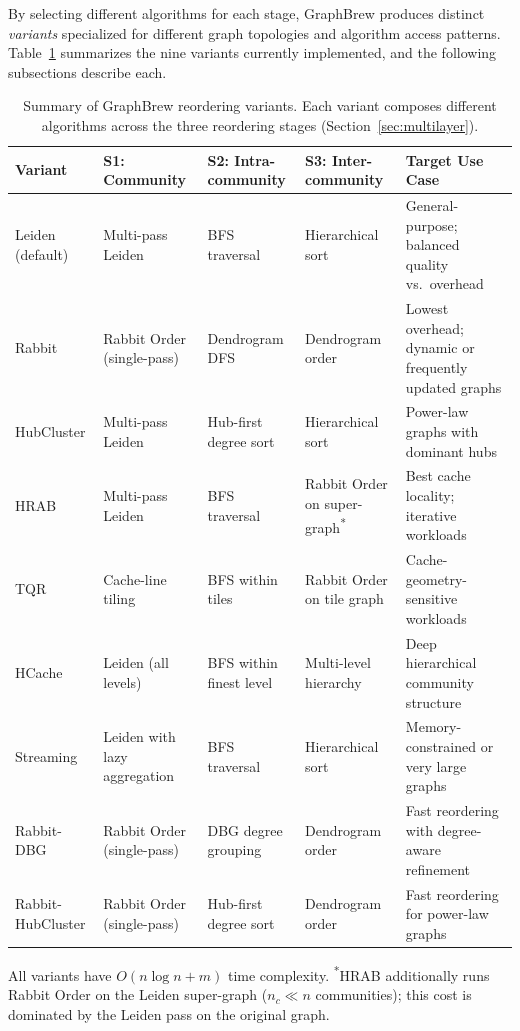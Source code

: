 \documentclass[sigconf, nonacm]{acmart}
\begin{document}
By selecting different algorithms for each stage, GraphBrew produces distinct \emph{variants} specialized for different graph topologies and algorithm access patterns. Table~\ref{table:variants} summarizes the nine variants currently implemented, and the following subsections describe each.

\begin{table}[t]
\centering
\caption{Summary of GraphBrew reordering variants. Each variant composes different algorithms across the three reordering stages (Section~\ref{sec:multilayer}).}
\footnotesize
\begin{tabular}{@{}llllp{4.0cm}@{}}
\toprule
\textbf{Variant} & \textbf{S1: Community} & \textbf{S2: Intra-community} & \textbf{S3: Inter-community} & \textbf{Target Use Case} \\
\midrule
Leiden (default)  & Multi-pass Leiden           & BFS traversal              & Hierarchical sort        & General-purpose; balanced quality vs.\ overhead \\
Rabbit            & Rabbit Order (single-pass)  & Dendrogram DFS             & Dendrogram order         & Lowest overhead; dynamic or frequently updated graphs \\
HubCluster        & Multi-pass Leiden           & Hub-first degree sort      & Hierarchical sort        & Power-law graphs with dominant hubs \\
HRAB              & Multi-pass Leiden           & BFS traversal              & Rabbit Order on super-graph\textsuperscript{*} & Best cache locality; iterative workloads \\
TQR               & Cache-line tiling          & BFS within tiles          & Rabbit Order on tile graph & Cache-geometry-sensitive workloads \\
HCache            & Leiden (all levels)        & BFS within finest level   & Multi-level hierarchy    & Deep hierarchical community structure \\
Streaming         & Leiden with lazy aggregation & BFS traversal             & Hierarchical sort        & Memory-constrained or very large graphs \\
Rabbit-DBG        & Rabbit Order (single-pass)  & DBG degree grouping        & Dendrogram order         & Fast reordering with degree-aware refinement \\
Rabbit-HubCluster & Rabbit Order (single-pass)  & Hub-first degree sort      & Dendrogram order         & Fast reordering for power-law graphs \\
\bottomrule
\end{tabular}
\par\smallskip\footnotesize All variants have $O(n\log n + m)$ time complexity. \textsuperscript{*}HRAB additionally runs Rabbit Order on the Leiden super-graph ($n_c \ll n$ communities); this cost is dominated by the Leiden pass on the original graph.
\label{table:variants}
\end{table}
\end{document}
